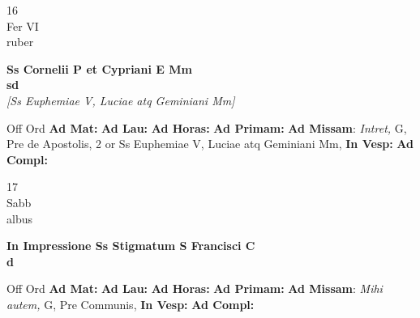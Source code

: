 \documentclass[10pt, openany]{book}
\begin{document}
    \begin{center}
        \begin{minipage}{3.5in}
            \vspace{2em}
            \begin{minipage}{0.5in}
                {\Huge 16} \\
                {\normalsize Fer VI} \\
                {\normalsize ruber}
            \end{minipage}
            \begin{minipage}{3.0in}
                \textbf{ \large Ss Cornelii P et Cypriani E Mm \\
                \textnormal{\normalsize sd}} \\ \textit{[Ss Euphemiae V, Luciae atq Geminiani Mm]} \\ 
            \end{minipage}
            \begin{justify}Off Ord
                \textbf{Ad Mat: }
                \textbf{Ad Lau: }
                \textbf{Ad Horas: }
                \textbf{Ad Primam: }\textbf{Ad Missam}: \textit{Intret,} G, Pre de Apostolis, 2 or Ss Euphemiae V, Luciae atq Geminiani Mm,  
                \textbf{In Vesp: }
                \textbf{Ad Compl: }
            \end{justify}
        \end{minipage}
    \end{center}

    \begin{center}
        \begin{minipage}{3.5in}
            \vspace{2em}
            \begin{minipage}{0.5in}
                {\Huge 17} \\
                {\normalsize Sabb} \\
                {\normalsize albus}
            \end{minipage}
            \begin{minipage}{3.0in}
                \textbf{ \large In Impressione Ss Stigmatum S Francisci C \\
                \textnormal{\normalsize d}} \\ 
            \end{minipage}
            \begin{justify}Off Ord
                \textbf{Ad Mat: }
                \textbf{Ad Lau: }
                \textbf{Ad Horas: }
                \textbf{Ad Primam: }\textbf{Ad Missam}: \textit{Mihi autem,} G, Pre Communis,  
                \textbf{In Vesp: }
                \textbf{Ad Compl: }
            \end{justify}
        \end{minipage}
    \end{center}
\end{document}
